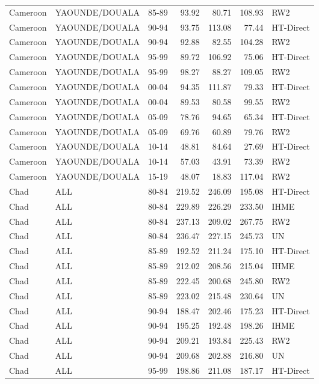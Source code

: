 \begin{longtable}{lllrrrl}
  Cameroon & YAOUNDE/DOUALA & 85-89 & 93.92 & 80.71 & 108.93 & RW2 \\ 
  Cameroon & YAOUNDE/DOUALA & 90-94 & 93.75 & 113.08 & 77.44 & HT-Direct \\ 
  Cameroon & YAOUNDE/DOUALA & 90-94 & 92.88 & 82.55 & 104.28 & RW2 \\ 
  Cameroon & YAOUNDE/DOUALA & 95-99 & 89.72 & 106.92 & 75.06 & HT-Direct \\ 
  Cameroon & YAOUNDE/DOUALA & 95-99 & 98.27 & 88.27 & 109.05 & RW2 \\ 
  Cameroon & YAOUNDE/DOUALA & 00-04 & 94.35 & 111.87 & 79.33 & HT-Direct \\ 
  Cameroon & YAOUNDE/DOUALA & 00-04 & 89.53 & 80.58 & 99.55 & RW2 \\ 
  Cameroon & YAOUNDE/DOUALA & 05-09 & 78.76 & 94.65 & 65.34 & HT-Direct \\ 
  Cameroon & YAOUNDE/DOUALA & 05-09 & 69.76 & 60.89 & 79.76 & RW2 \\ 
  Cameroon & YAOUNDE/DOUALA & 10-14 & 48.81 & 84.64 & 27.69 & HT-Direct \\ 
  Cameroon & YAOUNDE/DOUALA & 10-14 & 57.03 & 43.91 & 73.39 & RW2 \\ 
  Cameroon & YAOUNDE/DOUALA & 15-19 & 48.07 & 18.83 & 117.04 & RW2 \\ 
  Chad & ALL & 80-84 & 219.52 & 246.09 & 195.08 & HT-Direct \\ 
  Chad & ALL & 80-84 & 229.89 & 226.29 & 233.50 & IHME \\ 
  Chad & ALL & 80-84 & 237.13 & 209.02 & 267.75 & RW2 \\ 
  Chad & ALL & 80-84 & 236.47 & 227.15 & 245.73 & UN \\ 
  Chad & ALL & 85-89 & 192.52 & 211.24 & 175.10 & HT-Direct \\ 
  Chad & ALL & 85-89 & 212.02 & 208.56 & 215.04 & IHME \\ 
  Chad & ALL & 85-89 & 222.45 & 200.68 & 245.80 & RW2 \\ 
  Chad & ALL & 85-89 & 223.02 & 215.48 & 230.64 & UN \\ 
  Chad & ALL & 90-94 & 188.47 & 202.46 & 175.23 & HT-Direct \\ 
  Chad & ALL & 90-94 & 195.25 & 192.48 & 198.26 & IHME \\ 
  Chad & ALL & 90-94 & 209.21 & 193.84 & 225.43 & RW2 \\ 
  Chad & ALL & 90-94 & 209.68 & 202.88 & 216.80 & UN \\ 
  Chad & ALL & 95-99 & 198.86 & 211.08 & 187.17 & HT-Direct \\ 

\end{longtable}
